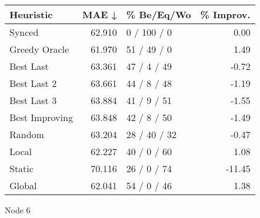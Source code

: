 \begin{tabular}{lrlr}
\toprule
\textbf{Heuristic} & \textbf{MAE ↓} & \textbf{\% Be/Eq/Wo} & \textbf{\% Improv.} \\
\midrule
            Synced &         62.910 &          0 / 100 / 0 &                0.00 \\
     Greedy Oracle &         61.970 &          51 / 49 / 0 &                1.49 \\
         Best Last &         63.361 &          47 / 4 / 49 &               -0.72 \\
       Best Last 2 &         63.661 &          44 / 8 / 48 &               -1.19 \\
       Best Last 3 &         63.884 &          41 / 9 / 51 &               -1.55 \\
    Best Improving &         63.848 &          42 / 8 / 50 &               -1.49 \\
            Random &         63.204 &         28 / 40 / 32 &               -0.47 \\
             Local &         62.227 &          40 / 0 / 60 &                1.08 \\
            Static &         70.116 &          26 / 0 / 74 &              -11.45 \\
            Global &         62.041 &          54 / 0 / 46 &                1.38 \\
\bottomrule
\end{tabular}
\caption{Node 6}
\label{tab:iid_lr05_le2_bs4_6}
